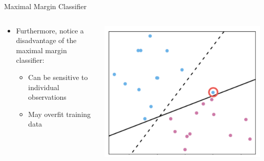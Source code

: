 \begin{frame}{Maximal Margin Classifier}
\begin{columns}
  \begin{column}{0.5\textwidth}
    \begin{itemize}
      \item Furthermore, notice a disadvantage of the maximal margin classifier:
      \begin{itemize}
        \item Can be sensitive to individual observations
        \item May overfit training data
      \end{itemize}
    \end{itemize}
  \end{column}
  \begin{column}{0.5\textwidth}
    \includegraphics[width=\linewidth]{images/support-vector-machines/support-vector-machines-10.png}
  \end{column}
\end{columns}
\end{frame}
